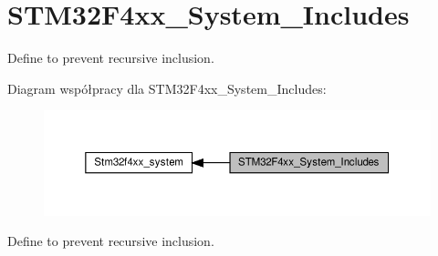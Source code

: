 \hypertarget{group___s_t_m32_f4xx___system___includes}{}\section{S\+T\+M32\+F4xx\+\_\+\+System\+\_\+\+Includes}
\label{group___s_t_m32_f4xx___system___includes}


Define to prevent recursive inclusion.  


Diagram współpracy dla S\+T\+M32\+F4xx\+\_\+\+System\+\_\+\+Includes\+:\nopagebreak
\begin{figure}[H]
\begin{center}
\leavevmode
\includegraphics[width=350pt]{group___s_t_m32_f4xx___system___includes}
\end{center}
\end{figure}
Define to prevent recursive inclusion. 

